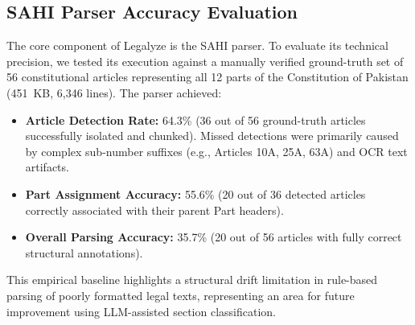 
\subsection{SAHI Parser Accuracy Evaluation}

The core component of Legalyze is the SAHI parser. To evaluate its technical precision,
we tested its execution against a manually verified ground-truth set of 56 constitutional
articles representing all 12 parts of the Constitution of Pakistan (451~KB, 6,346
lines). The parser achieved:
\begin{itemize}
  \item \textbf{Article Detection Rate:} 64.3\% (36 out of 56 ground-truth articles
  successfully isolated and chunked). Missed detections were primarily caused by complex
  sub-number suffixes (e.g., Articles 10A, 25A, 63A) and OCR text artifacts.
  \item \textbf{Part Assignment Accuracy:} 55.6\% (20 out of 36 detected articles
  correctly associated with their parent Part headers).
  \item \textbf{Overall Parsing Accuracy:} 35.7\% (20 out of 56 articles with fully
  correct structural annotations).
\end{itemize}
This empirical baseline highlights a structural drift limitation in rule-based parsing
of poorly formatted legal texts, representing an area for future improvement using
LLM-assisted section classification.

